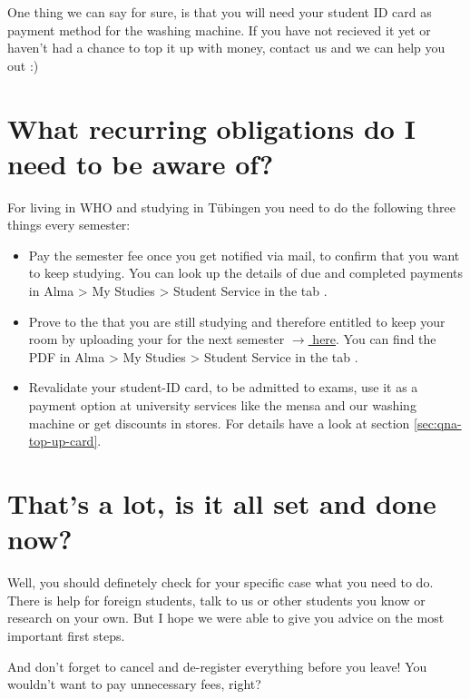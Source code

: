 One thing we can say for sure, is that you will need your student ID card as payment method for the washing machine. If you have not recieved it yet or haven't had a chance to top it up with money, contact us and we can help you out :)

\section{What recurring obligations do I need to be aware of?}

For living in WHO and studying in Tübingen you need to do the following three things every semester:

\begin{itemize}
    \item Pay the semester fee once you get notified via mail, to confirm that you want to keep studying. You can look up the details of due and completed payments in Alma > My Studies > Student Service in the tab .

    \item Prove to the  that you are still studying and therefore entitled to keep your room by uploading your  for the next semester \href{https://tl1.eu/SWTUE/#maintenance/upload}{$\rightarrow{}$ here}. You can find the PDF in Alma > My Studies > Student Service in the tab .

    \item Revalidate your student-ID card, to be admitted to exams, use it as a payment option at university services like the mensa and our washing machine or get discounts in stores. For details have a look at section \ref{sec:qna-top-up-card}.
\end{itemize}

\section{That's a lot, is it all set and done now?}

Well, you should definetely check for your specific case what you need to do. There is help for foreign students, talk to us or other students you know or research on your own. But I hope we were able to give you advice on the most important first steps.

And don't forget to cancel and de-register everything before you leave! You wouldn't want to pay unnecessary fees, right?